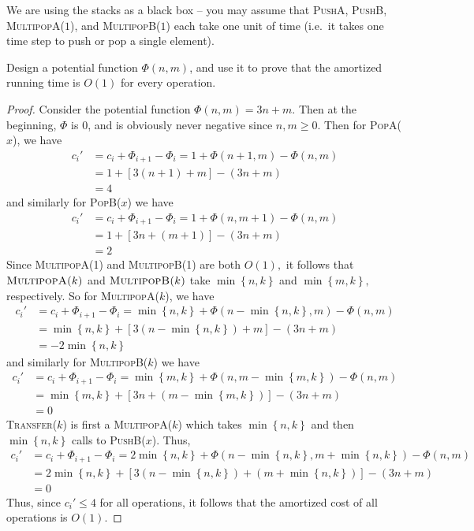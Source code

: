 \documentclass{article}
\begin{document}
We are using the stacks as a black box -- you may assume that \textsc{PushA}, \textsc{PushB}, \textsc{MultipopA($1$)}, and \textsc{MultipopB($1$)} each take one unit of time (i.e.~it takes one time step to push or pop a single element).

Design a potential function $\Phi(n,m)$, and use it to prove that the amortized running time is $O(1)$ for every operation.
\begin{proof}
	Consider the potential function $\Phi(n, m) = 3n+m.$ Then at the beginning, $\Phi$ is 0, and is obviously never negative since $n, m\ge 0.$ Then for \textsc{PopA($x$)}, we have
	\begin{align*}
		c_i' &= c_i + \Phi_{i+1}-\Phi_i = 1 + \Phi(n+1, m) - \Phi(n, m) \\
		&= 1 + \left[ 3(n+1)+m \right] - (3n+m) \\
		&= 4
	\end{align*}
	and similarly for \textsc{PopB($x$)} we have
	\begin{align*}
		c_i' &= c_i + \Phi_{i+1} - \Phi_i = 1 + \Phi(n, m+1) - \Phi(n, m) \\
		&= 1 + \left[ 3n+(m+1) \right] - (3n+m) \\
		&= 2
	\end{align*}
	Since \textsc{MultipopA(1)} and \textsc{MultipopB(1)} are both $O(1),$ it follows that $\textsc{MultipopA($k$)}$ and $\textsc{MultipopB($k$)}$ take $\min\left\{ n, k \right\}$ and $\min\left\{ m, k \right\},$ respectively. So for \textsc{MultipopA($k$)}, we have
	\begin{align*}
		c_i' &= c_i + \Phi_{i+1} - \Phi_i = \min\left\{ n, k \right\} + \Phi\left( n-\min\left\{ n, k \right\}, m \right) - \Phi(n, m) \\
		&= \min\left\{ n, k \right\} + \left[ 3\left( n-\min\left\{ n, k \right\} \right) + m \right] - (3n+m) \\
		&= -2\min\left\{ n, k \right\}
	\end{align*}
	and similarly for \textsc{MultipopB($k$)} we have
	\begin{align*}
		c_i' &= c_i + \Phi_{i+1} - \Phi_i = \min\left\{ m, k \right\} + \Phi\left( n, m-\min\left\{ m, k \right\} \right) - \Phi(n, m) \\
		&= \min\left\{ m, k \right\} + \left[ 3n+\left( m-\min\left\{ m, k \right\} \right) \right] - (3n+m) \\
		&= 0
	\end{align*}
	\textsc{Transfer($k$)} is first a \textsc{MultipopA($k$)} which takes $\min\left\{ n, k \right\}$ and then $\min\left\{ n, k \right\}$ calls to \textsc{PushB($x$)}. Thus,
	\begin{align*}
		c_i' &= c_i + \Phi_{i+1} - \Phi_i = 2\min\left\{ n, k \right\} + \Phi\left( n-\min\left\{ n, k \right\}, m+\min\left\{ n, k \right\} \right) - \Phi(n, m) \\
		&= 2\min\left\{ n, k \right\} + \left[ 3\left( n-\min\left\{ n, k \right\} \right) + \left( m+\min\left\{ n, k \right\} \right) \right] - (3n+m) \\
		&= 0
	\end{align*}
	Thus, since $c_i'\le 4$ for all operations, it follows that the amortized cost of all operations is $O(1).$
\end{proof}
\end{document}

